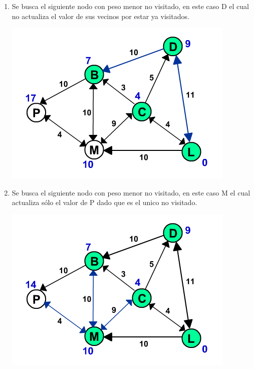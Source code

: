 \documentclass[dcc,sol]{fcfmcourse}
\begin{document}
\begin{problems}
\begin{enumerate}[1.]
\newpage
\item Se busca el siguiente nodo con peso menor no visitado, en este caso D el cual no actualiza el valor de sus vecinos por estar ya visitados.
\begin{center}
\includegraphics[scale=0.65]{dijkstra0005.png}
\end{center}

\item Se busca el siguiente nodo con peso menor no visitado, en este caso M el cual actualiza sólo el valor de P dado que es el unico no visitado.
\begin{center}
\includegraphics[scale=0.65]{dijkstra0006.png}
\end{center}


\end{enumerate}
\end{problems}
\end{document}

